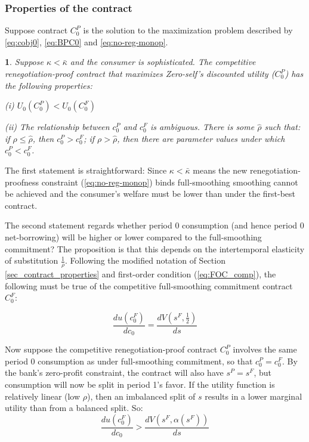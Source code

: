\documentclass[11pt,english]{article}
\theoremstyle{plain}
\newtheorem{prop}{\protect\propositionname}
\theoremstyle{definition}
\providecommand{\propositionname}{Proposition}
\begin{document}
\subsubsection{Properties of the contract}

Suppose contract $C_{0}^{P}$ is the solution to the maximization
problem described by \ref{eq:cobj0}, \ref{eq:BPC0} and \ref{eq:no-reg-monop}. 
\begin{prop}
Suppose $\kappa<\bar{\kappa}$ and the consumer is sophisticated.
The competitive renegotiation-proof contract that
maximizes Zero-self's discounted utility ($C_{0}^{P}$) has the following
properties:

(i) $U_{0}\left(C_{0}^{P}\right)<U_{0}\left(C_{0}^{F}\right)$

(ii) The relationship between $c_{0}^{P}$ and $c_{0}^{F}$ is ambiguous.
There is some $\hat{\rho}$ such that: if $\rho\leq\hat{\rho}$, then
$c_{0}^{P}>c_{0}^{F}$; if $\rho>\hat{\rho}$, then there are parameter
values under which $c_{0}^{P}<c_{0}^{F}$. 
\end{prop}
The first statement is straightforward: Since $\kappa<\bar{\kappa}$
means the new renegotiation-proofness constraint (\ref{eq:no-reg-monop})
binds full-smoothing smoothing cannot be achieved and the consumer's
welfare must be lower than under the first-best contract.

The second statement regards whether period 0 consumption  (and hence period 0 net-borrowing) will be higher or lower compared to the full-smoothing
commitment? The proposition is that this depends on the intertemporal elasticity of substitution $\frac{1}{\rho}$.
Following the modified notation of Section \ref{sec_contract_properties}
and first-order condition (\ref{eq:FOC_comp}),  the following must be true of the competitive full-smoothing commitment contract $C_{0}^{F}$:

\begin{equation}
\frac{du\left(c_{0}^{F}\right)}{dc_{0}}=\frac{dV\left(s^{F},\frac{1}{2}\right)}{ds}
\end{equation}

Now suppose the competitive renegotiation-proof contract $C_{0}^{P}$
involves the same period 0 consumption as under full-smoothing commitment,
so that $c_{0}^{P}=c_{0}^{F}$. By the bank's zero-profit constraint,
the contract will also have $s^{P}=s^{F}$, but consumption will now be
split in period 1's favor. If the utility function is relatively linear
(low $\rho$), then an imbalanced split of $s$ results in a lower
marginal utility than from a balanced split. So: 
\begin{equation}
\frac{du\left(c_{0}^{F}\right)}{dc_{0}}>\frac{dV\left(s^{F},\alpha\left(s^{F}\right)\right)}{ds}
\end{equation}
\end{document}
